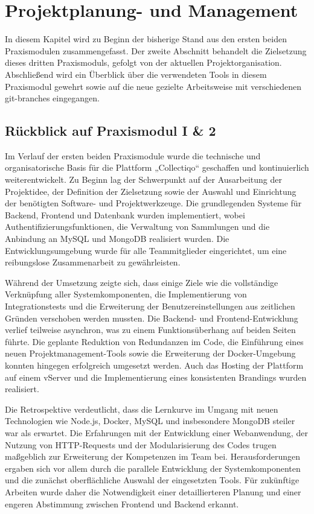 \section{Projektplanung- und Management}\label{sec:section-one}

In diesem Kapitel wird zu Beginn der bisherige Stand aus den ersten beiden Praxismodulen zusammengefasst.
Der zweite Abschnitt behandelt die Zielsetzung dieses dritten Praxismoduls, gefolgt von der aktuellen Projektorganisation.
Abschließend wird ein Überblick über die verwendeten Tools in diesem Praxismodul gewehrt sowie auf die neue gezielte Arbeitsweise mit verschiedenen git-branches eingegangen.

\subsection{Rückblick auf Praxismodul I \& 2}\label{subsec:subsection-one-one}

Im Verlauf der ersten beiden Praxismodule wurde die technische und organisatorische Basis für die Plattform „Collectiqo“ geschaffen und kontinuierlich weiterentwickelt.
Zu Beginn lag der Schwerpunkt auf der Ausarbeitung der Projektidee, der Definition der Zielsetzung sowie der Auswahl und Einrichtung der benötigten Software- und Projektwerkzeuge.
Die grundlegenden Systeme für Backend, Frontend und Datenbank wurden implementiert, wobei Authentifizierungsfunktionen, die Verwaltung von Sammlungen und die Anbindung an MySQL und MongoDB realisiert wurden.
Die Entwicklungsumgebung wurde für alle Teammitglieder eingerichtet, um eine reibungslose Zusammenarbeit zu gewährleisten.

Während der Umsetzung zeigte sich, dass einige Ziele wie die vollständige Verknüpfung aller Systemkomponenten, die Implementierung von Integrationstests und die Erweiterung der Benutzereinstellungen aus zeitlichen Gründen verschoben werden mussten.
Die Backend- und Frontend-Entwicklung verlief teilweise asynchron, was zu einem Funktionsüberhang auf beiden Seiten führte.
Die geplante Reduktion von Redundanzen im Code, die Einführung eines neuen Projektmanagement-Tools sowie die Erweiterung der Docker-Umgebung konnten hingegen erfolgreich umgesetzt werden.
Auch das Hosting der Plattform auf einem vServer und die Implementierung eines konsistenten Brandings wurden realisiert.

Die Retrospektive verdeutlicht, dass die Lernkurve im Umgang mit neuen Technologien wie Node.js, Docker, MySQL und insbesondere MongoDB steiler war als erwartet.
Die Erfahrungen mit der Entwicklung einer Webanwendung, der Nutzung von HTTP-Requests und der Modularisierung des Codes trugen maßgeblich zur Erweiterung der Kompetenzen im Team bei.
Herausforderungen ergaben sich vor allem durch die parallele Entwicklung der Systemkomponenten und die zunächst oberflächliche Auswahl der eingesetzten Tools.
Für zukünftige Arbeiten wurde daher die Notwendigkeit einer detaillierteren Planung und einer engeren Abstimmung zwischen Frontend und Backend erkannt.

